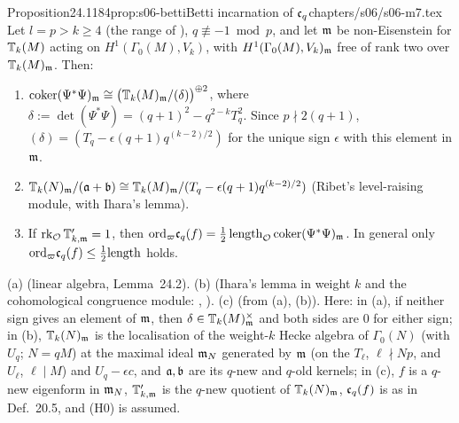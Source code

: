 \begin{quoted}{Proposition}{24.1}{184}{prop:s06-betti}{Betti incarnation of $\mathfrak{c}_q$}{chapters/s06/s06-m7.tex}\label{rpt:prop:s06-betti}
Let $l=p>k\ge4$ (the range of ), $q\not\equiv-1\bmod p$, and let $\mathfrak{m}$ be non-Eisenstein for $\mathbb{T}_k(M)$ acting on
$H^1(\Gamma_0(M),V_k)$, with $H^1(\Gamma_0(M),V_k)_{\mathfrak{m}}$ free of rank two over $\mathbb{T}_k(M)_{\mathfrak{m}}$. Then:
\begin{enumerate}[label=(\alph*)]
\item $\operatorname{coker}(\Psi^*\Psi)_{\mathfrak{m}}\cong\big(\mathbb{T}_k(M)_{\mathfrak{m}}/(\delta)\big)^{\oplus2}$, where $\delta:=\det(\Psi^*\Psi)=(q+1)^2-q^{2-k}T_q^2$.
  Since $p\nmid2(q+1)$, $(\delta)=(T_q-\epsilon(q+1)q^{(k-2)/2})$ for the unique sign $\epsilon$ with this element in $\mathfrak{m}$.
\item $\mathbb{T}_k(N)_{\mathfrak{m}}/(\mathfrak{a}+\mathfrak{b})\cong\mathbb{T}_k(M)_{\mathfrak{m}}/(T_q-\epsilon(q+1)q^{(k-2)/2})$ (Ribet's level-raising module, with Ihara's lemma).
\item If $\operatorname{rk}_{\mathcal{O}}\mathbb{T}'_{k,\mathfrak{m}}=1$, then $\mathrm{ord}_\varpi\mathfrak{c}_q(f)=\tfrac12\,\mathrm{length}_{\mathcal{O}}\operatorname{coker}(\Psi^*\Psi)_{\mathfrak{m}}$. In general only
  $\mathrm{ord}_\varpi\mathfrak{c}_q(f)\le\tfrac12\mathrm{length}$ holds.
\end{enumerate}
(a) \stproved{} (linear algebra, Lemma~24.2). (b) \stpmc{} (Ihara's lemma in weight $k$ and the cohomological
congruence module: \cite[Lemma~3.2 and \S2]{Dia91}, \cite[\S3]{Dia89}). (c) \stpmc{} (from (a), (b)).
Here: in (a), if neither sign gives an element of $\mathfrak{m}$, then $\delta\in\mathbb{T}_k(M)_{\mathfrak{m}}^\times$ and both sides are $0$ for either sign;
in (b), $\mathbb{T}_k(N)_{\mathfrak{m}}$ is the localisation of the weight-$k$ Hecke algebra of $\Gamma_0(N)$ (with $U_q$; $N=qM$) at the maximal ideal $\mathfrak{m}_N$
generated by $\mathfrak{m}$ (on the $T_\ell$, $\ell\nmid Np$, and $U_\ell$, $\ell\mid M$) and $U_q-\epsilon c$, and $\mathfrak{a},\mathfrak{b}$ are its $q$-new and
$q$-old kernels; in (c), $f$ is a $q$-new eigenform in $\mathfrak{m}_N$, $\mathbb{T}'_{k,\mathfrak{m}}$ is the $q$-new quotient of $\mathbb{T}_k(N)_{\mathfrak{m}}$, $\mathfrak{c}_q(f)$ is as in
Def.~20.5, and (H0) is assumed. 
\end{quoted}
